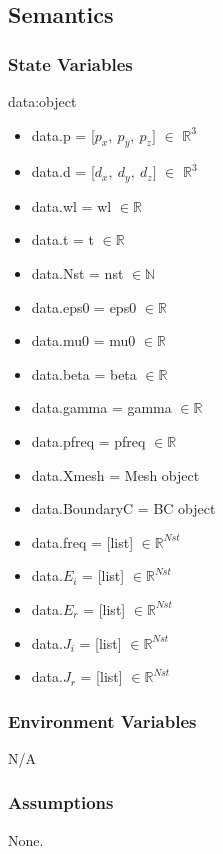 \documentclass[12pt, titlepage]{article}
\begin{document}
\subsection{Semantics}

\subsubsection{State Variables}

data:object 
\begin{itemize}
	\item data.p = [$p_x,\ p_y,\ p_z]$ $\in$ $\mathbb{R}^3$
	\item data.d = [$d_x,\ d_y,\ d_z]$ $\in$ $\mathbb{R}^3$
	\item data.wl = wl $\in \mathbb{R}$
	\item data.t = t $\in \mathbb{R}$	
	\item data.Nst = nst $\in \mathbb{N}$
	\item data.eps0 = eps0 $\in \mathbb{R}$
	\item data.mu0 = mu0 $\in \mathbb{R}$
	\item data.beta = beta $\in \mathbb{R}$
	\item data.gamma = gamma $\in \mathbb{R}$
	\item data.pfreq = pfreq $\in \mathbb{R}$
	\item data.Xmesh = Mesh object
	\item data.BoundaryC = BC object
	\item data.freq = [list]  $\in \mathbb{R}^{Nst}$ 
	\item data.$E_i$ = [list] $\in \mathbb{R}^{Nst}$ 
	\item data.$E_r$ = [list] $\in \mathbb{R}^{Nst}$ 
	\item data.$J_i$ = [list] $\in \mathbb{R}^{Nst}$ 
	\item data.$J_r$ = [list] $\in \mathbb{R}^{Nst}$ 
	
\end{itemize}

\subsubsection{Environment Variables}

N/A
\subsubsection{Assumptions}

None.
\end{document}
